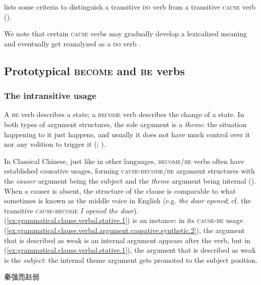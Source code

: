 \documentclass[UTF8, a4paper, oneside, scheme=plain, 12pt]{ctexrep}
\newcommand*{\citepage}[1]{p.~{#1}}
\newcommand*{\citepages}[1]{pp.~{#1}}
\newcommand*{\term}[1]{\emph{#1}}
\newcommand{\form}[1]{\emph{#1}}
\newcommand*{\category}[1]{\textsc{#1}}
\begin{document}
\citet[\citepage{272}]{meiguang2018} lists some criteria
to distinguish a transitive \category{do} verb 
from a transitive \category{cause} verb
().

We note that certain \category{cause} verbs may gradually develop a lexicalized meaning
and eventually get reanalyzed as a \category{do} verb
\citep[\citepages{269-271}]{meiguang2018}.

\subsection{Prototypical \category{become} and \category{be} verbs}
\label{sec:valency.simple.state-and-change}

\subsubsection{The intransitive usage}

A \category{be} verb describes a state;
a \category{become} verb describes the change of a state.
In both types of argument structures,
the sole argument is a \term{theme}:
the situation happening to it just happens,
and usually it does not have much control over it nor any volition to trigger it
(\citealt[\citepage{345}]{li2004grammar}; \citealt[\citepage{275}]{meiguang2018}).

In Classical Chinese, just like in other languages,
\category{become}/\category{be} verbs often have established causative usages,
forming \category{cause}-\category{become}/\category{be} argument structures
with the \term{causer} argument being the subject and the \term{theme} argument being internal
().
When a causer is absent, the structure of the clause 
is comparable to what sometimes is known as the middle voice in English
(e.g. \form{the door opened}; cf. the transitive \category{cause}-\category{become} \form{I opened the door}).
(\ref{ex:grammatical.clause.verbal.stative.1}) is an instance:
in its \category{cause}-\category{be} usage (\ref{ex:grammatical.clause.verbal.argument.causative.synthetic.2}),
the argument that is described as weak is an internal argument appears after the verb,
but in (\ref{ex:grammatical.clause.verbal.stative.1}),
the argument that is described as weak is the \emph{subject}:
the internal theme argument gets promoted to the subject position.

\begin{exe}
    \ex\label{ex:grammatical.clause.verbal.stative.1} 秦强而赵弱
\end{exe}
\end{document}
